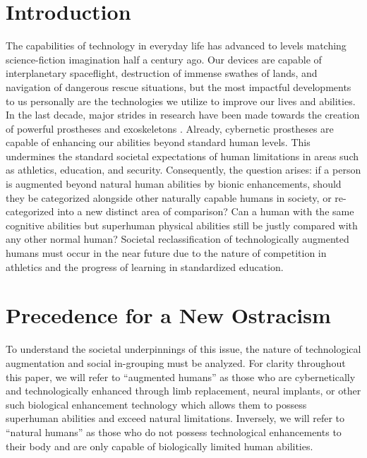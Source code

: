 \documentclass[10pt, oneside, letterpaper]{article}
\begin{document}
	\begin{multicols}{2}

	\section{Introduction}

	The capabilities of technology in everyday life has advanced to levels matching science-fiction imagination half a century ago. Our devices are capable of interplanetary spaceflight, destruction of immense swathes of lands, and navigation of dangerous rescue situations, but the most impactful developments to us personally are the technologies we utilize to improve our lives and abilities. In the last decade, major strides in research have been made towards the creation of powerful prostheses and exoskeletons \cite{Benabid2019}. Already, cybernetic prostheses are capable of enhancing our abilities beyond standard human levels. This undermines the standard societal expectations of human limitations in areas such as athletics, education, and security. Consequently, the question arises: if a person is augmented beyond natural human abilities by bionic enhancements, should they be categorized alongside other naturally capable humans in society, or re-categorized into a new distinct area of comparison? Can a human with the same cognitive abilities but superhuman physical abilities still be justly compared with any other normal human? Societal reclassification of technologically augmented humans must occur in the near future due to the nature of competition in athletics and the progress of learning in standardized education.

	\section{Precedence for a New Ostracism}

	To understand the societal underpinnings of this issue, the nature of technological augmentation and social in-grouping must be analyzed. For clarity throughout this paper, we will refer to ``augmented humans'' as those who are cybernetically and technologically enhanced through limb replacement, neural implants, or other such biological enhancement technology which allows them to possess superhuman abilities and exceed natural limitations. Inversely, we will refer to ``natural humans'' as those who do not possess technological enhancements to their body and are only capable of biologically limited human abilities.


\end{multicols}
\end{document}
